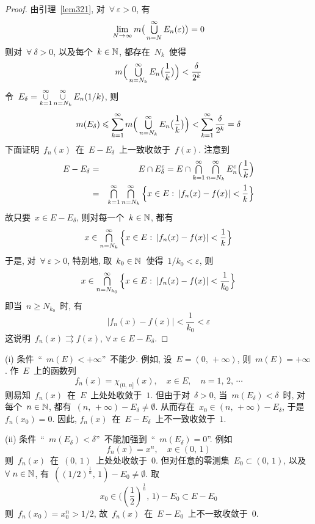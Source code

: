 \begin{proof}
由引理~\ref{lem321}, 对~$\forall~\varepsilon > 0$, 有
\[
\lim_{N \to \infty} m \big( \mathop{\textstyle{\bigcup}}_{n=N}^\infty E_n(\varepsilon) \big) = 0
\]
则对~$\forall~\delta > 0$, 以及每个~$k \in \mathbb{N}$, 都存在~$N_k$~使得
\[
m\Big( \mathop{\textstyle{\bigcup}}_{n = N_k}^\infty E_n\big( \frac{1}{k} \big) \Big) < \frac{\delta}{2^k}
\]
令~$E_\delta = \mathop{\cup}\limits_{k=1}^\infty \mathop{\cup}\limits_{n=N_k}^\infty E_n(1/k)$, 则
\[
m(E_\delta) \leqslant \sum_{k=1}^\infty m\Big( \mathop{\textstyle{\bigcup}}_{n=N_k}^\infty E_n\big( \frac{1}{k} \big) \Big) < \sum_{k=1}^\infty \frac{\delta}{2^k} = \delta
\]
下面证明~$f_n(x)$~在~$E - E_\delta$~上一致收敛于~$f(x)$. 注意到
\begin{eqnarray*}
E - E_\delta &=& E \cap E^c_\delta = E \cap \mathop{\textstyle{\bigcap}}\limits_{k=1}^\infty \mathop{\textstyle{\bigcap}}\limits_{n=N_k}^\infty E^c_n\Big( \frac{1}{k} \Big) \\
&=& \mathop{\textstyle{\bigcap}}\limits_{k=1}^\infty \mathop{\textstyle{\bigcap}}\limits_{n=N_k}^\infty \Big\{ x \in E: \: |f_n(x) - f(x)| < \frac{1}{k} \Big\}
\end{eqnarray*}
故只要~$x \in E - E_\delta$, 则对每一个~$k \in \mathbb{N}$, 都有
\[
x \in \mathop{\textstyle{\bigcap}}_{n=N_{k}}^\infty \Big\{ x \in E: \: |f_n(x) - f(x)| < \frac{1}{k} \Big\}
\]
于是, 对~$\forall~\varepsilon > 0$, 特别地, 取~$k_0 \in \mathbb{N}$~使得~$1/k_0 < \varepsilon$, 则
\[
x \in \mathop{\textstyle{\bigcap}}_{n=N_{k_0}}^\infty \Big\{ x \in E: \: |f_n(x) - f(x)| < \frac{1}{k_0} \Big\}
\]
即当~$n \geqslant N_{k_0}$~时, 有
\[
|f_n(x) - f(x)| < \frac{1}{k_0} < \varepsilon
\]
这说明~$f_n(x) \rightrightarrows f(x), \, \forall~x \in E - E_\delta$.
\end{proof}

\begin{remark}
(i) 条件~``~$m(E) < +\infty$''~不能少. 例如, 设~$E = (0,\,+\infty)$, 则~$m(E) = + \infty$. 作~$E$~上的函数列
\[
f_n(x) = \chi_{(0,\,n]} (x), \quad x \in E, \quad n = 1,\,2,\,\cdots
\]
则易知~$f_n(x)$~在~$E$~上处处收敛于~$1$. 但由于对~$\delta > 0$,
当~$m(E_\delta) < \delta$~时, 对每个~$n \in \mathbb{N}$, 都有~$(n,\,+\infty) - E_\delta \neq \emptyset$. 从而存在~$x_0 \in (n,\,+\infty) - E_\delta$, 于是~$f_n(x_0) = 0$.
因此, $f_n(x)$~在~$E - E_\delta$~上不一致收敛于~$1$.

\smallskip

(ii) 条件~``~$m(E_\delta) < \delta$''~不能加强到~``~$m(E_\delta) = 0$''.
例如
\[
f_n(x) = x^n, \quad x \in (0,\,1)
\]
则~$f_n(x)$~在~$(0,\,1)$~上处处收敛于~$0$. 但对任意的零测集~$E_0 \subset (0,\,1)$, 以及~$\forall~n \in \mathbb{N}$, 有~$(\left(1/2\right)^{\frac{1}{n}},\,1) - E_0 \neq \emptyset$. 取
\[
x_0 \in \Big(\left(\frac{1}{2}\right)^{\frac{1}{n}},\,1 \Big) - E_0 \subset E - E_0
\]
则~$f_n(x_0) = x^n_0 > 1/2$, 故~$f_n(x)$~在~$E - E_0$~上不一致收敛于~$0$.
\end{remark}


